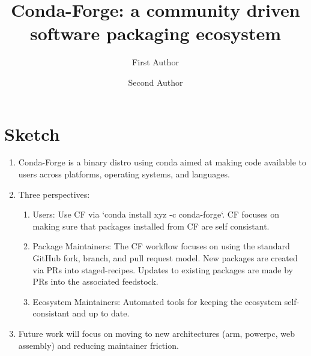 \documentclass[fleqn,10pt,lineno]{wlpeerj} %
\title{Conda-Forge: a community driven software packaging ecosystem}
\author[1]{First Author}
\author[2]{Second Author}
\affil[1]{Address of first author}
\affil[2]{Address of second author}
\begin{document}
\flushbottom
\maketitle
\thispagestyle{empty}


\section*{Sketch}
\begin{enumerate}
\item Conda-Forge is a binary distro using conda aimed at making code
available to users across platforms, operating systems, and languages.
\item Three perspectives:
\begin{enumerate}
\item Users: Use CF via `conda install xyz -c conda-forge`. CF focuses
on making sure that packages installed from CF are self consistant.
\item Package Maintainers: The CF workflow focuses on using the standard
GitHub fork, branch, and pull request model. New packages are created via
PRs into staged-recipes. Updates to existing packages are made by PRs into
the associated feedstock.
\item Ecosystem Maintainers: Automated tools for keeping the ecosystem
self-consistant and up to date.
\end{enumerate}
\item Future work will focus on moving to new architectures (arm, powerpc,
web assembly) and reducing maintainer friction.
\end{enumerate}
\end{document}
